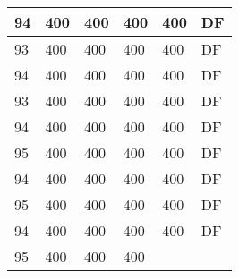 \begin{table}[]
\begin{tabular}{lllll|l|}
94                                  & 400                                & 400                                & 400                                & 
400                                & DF                                    \\ \hline
93                                  & 400                                & 400                                & 400                                & 
400                                & DF                                    \\ \hline
94                                  & 400                                & 400                                & 400                                & 
400                                & DF                                    \\ \hline
93                                  & 400                                & 400                                & 400                                & 
400                                & DF                                    \\ \hline
94                                  & 400                                & 400                                & 400                                & 
400                                & DF                                    \\ \hline
95                                  & 400                                & 400                                & 400                                & 
400                                & DF                                    \\ \hline
94                                  & 400                                & 400                                & 400                                & 
400                                & DF                                    \\ \hline
95                                  & 400                                & 400                                & 400                                & 
400                                & DF                                    \\ \hline
94                                  & 400                                & 400                                & 400                                & 
400                                & DF                                    \\ \hline
95                                  & 400                                & 400                                & 400                                & 

\end{tabular}
\end{table}
